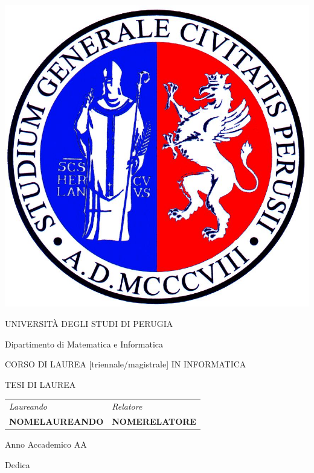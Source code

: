 \documentclass[
    a4paper,
    11pt,
    oneside,
    hidelinks
]{book}
\newenvironment{dedication}					%
{											%
   \cleardoublepage							%
   \thispagestyle{empty}						%
   \vspace*{\stretch{1}}						%
   \hfill\begin{minipage}[t]{0.88\textwidth}	%
   \raggedleft								%
}											%
{											%
   \end{minipage}							%
   \vspace*{\stretch{3}}						%
   \clearpage								%
}											%
\begin{document}
\begin{titlepage}
\begin{center}
\includegraphics[scale=0.16]{imgsx.jpg}
\vspace{50pt}

UNIVERSITÀ DEGLI STUDI DI PERUGIA

Dipartimento di Matematica e Informatica
\vspace{30pt}

CORSO DI LAUREA [triennale/magistrale] IN INFORMATICA
\vspace{30pt}

TESI DI LAUREA
\bigskip

\vspace{110pt}

\begin{tabular}{p{230pt}l}
\textit{Laureando} & \textit{Relatore} \\
\textbf{NOMELAUREANDO} & \textbf{NOMERELATORE}
\end{tabular}
\vspace{48pt}

Anno Accademico AA
\end{center}
\end{titlepage}

\cleardoublepage
\newpage	
\begin{dedication}
Dedica
\end{dedication}
\end{document}
